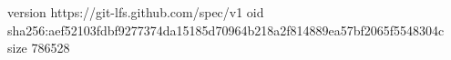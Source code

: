 version https://git-lfs.github.com/spec/v1
oid sha256:aef52103fdbf9277374da15185d70964b218a2f814889ea57bf2065f5548304c
size 786528

